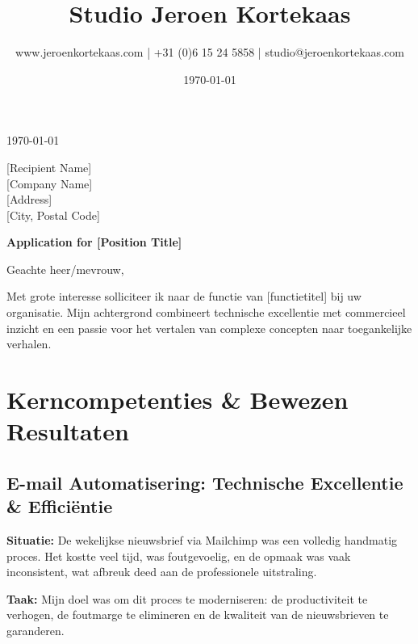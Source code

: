 \documentclass[11pt,a4paper]{article}
\title{Studio Jeroen Kortekaas}
\author{www.jeroenkortekaas.com | +31 (0)6 15 24 5858 | studio@jeroenkortekaas.com}
\date{\today}
\begin{document}
\maketitle

\begin{flushright}
\color{accentgray}\sffamily\today
\end{flushright}

\vspace{1em}

\begin{flushleft}
\color{primaryblue}\sffamily
{[Recipient Name]}\\
{[Company Name]}\\
{[Address]}\\
{[City, Postal Code]}
\end{flushleft}

\vspace{1.5em}

\begin{center}
\large\sffamily\bfseries\color{primaryblue}Application for {[Position Title]}
\end{center}

\vspace{1em}

Geachte heer/mevrouw,

Met grote interesse solliciteer ik naar de functie van {[functietitel]} bij uw organisatie. Mijn achtergrond combineert technische excellentie met commercieel inzicht en een passie voor het vertalen van complexe concepten naar toegankelijke verhalen.

\section{Kerncompetenties \& Bewezen Resultaten}

\subsection{E-mail Automatisering: Technische Excellentie \& Efficiëntie}

\textbf{\color{accentgray}Situatie:} De wekelijkse nieuwsbrief via Mailchimp was een volledig handmatig proces. Het kostte veel tijd, was foutgevoelig, en de opmaak was vaak inconsistent, wat afbreuk deed aan de professionele uitstraling.

\textbf{\color{accentgray}Taak:} Mijn doel was om dit proces te moderniseren: de productiviteit te verhogen, de foutmarge te elimineren en de kwaliteit van de nieuwsbrieven te garanderen.
\end{document}
